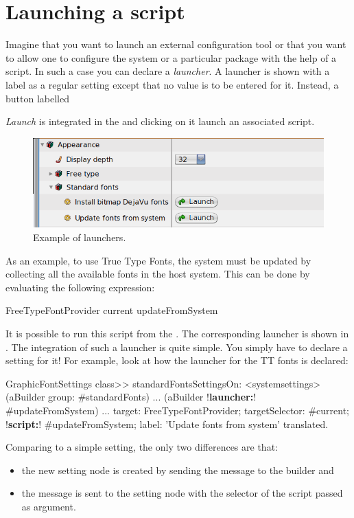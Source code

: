 \documentclass[a4paper,10pt,twoside]{book}
\begin{document}
\section{Launching a script}
Imagine that you want to launch an external configuration tool or that you want to allow one to configure the system or a particular package with the help of a script. In such a case you can declare a \textit{launcher}. A launcher is shown with a label as a regular setting except that no value is to be entered for it. Instead, a button labelled {\textit{Launch} is integrated in the \setbrowser and clicking on it launch an associated script.

\begin{figure}[tbh]
\begin{center}
\includegraphics[scale=0.38]{launcher}
\caption{Example of launchers.}
\end{center}
\end{figure}

As an example, to use True Type Fonts, the system must be updated by collecting all the available fonts in the host system. This can be done by evaluating the following expression:
\begin{code}{}
FreeTypeFontProvider current updateFromSystem
\end{code}
It is  possible to run this script from the \setbrowser. The corresponding launcher is shown in .
The integration of such a launcher is quite simple. You simply have to declare a setting for it! For example, look at how the launcher for the TT fonts is declared:

\begin{code}{}
GraphicFontSettings class>> standardFontsSettingsOn:
	<systemsettings>
	(aBuilder group: #standardFonts)
		...
		(aBuilder !\textbf{launcher:}! #updateFromSystem) ...
				target: FreeTypeFontProvider;
				targetSelector: #current;
				!\textbf{script:}! #updateFromSystem;
				label: 'Update fonts from system' translated.
\end{code}

Comparing to a simple setting, the only two differences are that:
\begin{itemize}
\item the new setting node is created by sending the  message to the builder and
\item the message  is sent to the setting node with the selector of the script passed as argument.
\end{itemize}

}
\end{document}
